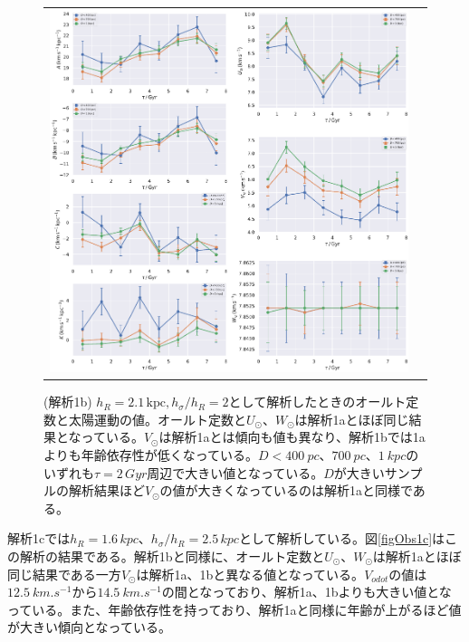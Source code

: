 \begin{figure}
   \centering
\begin{tabular}{cc}
\includegraphics[width=16cm]{fig/1b.pdf}
\end{tabular}
    \caption{(解析1b) $h_R=2.1\,\mathrm{kpc}, h_{\sigma}/h_R=2$として解析したときのオールト定数と太陽運動の値。オールト定数と$U_{\odot}、W_{\odot}$は解析1aとほぼ同じ結果となっている。$V_{\odot}$は解析1aとは傾向も値も異なり、解析1bでは1aよりも年齢依存性が低くなっている。$D<\SI{400}{pc}、\SI{700}{pc}、\SI{1}{kpc}$のいずれも$\tau=2\,\si{Gyr}$周辺で大きい値となっている。$D$が大きいサンプルの解析結果ほど$V_{\odot}$の値が大きくなっているのは解析1aと同様である。}
    \label{figObs1b}
\end{figure}

解析1cでは$h_R=1.6\,\si{kpc}、h_{\sigma}/h_R=2.5\,\si{kpc}$として解析している。図\ref{figObs1c}はこの解析の結果である。解析1bと同様に、オールト定数と$U_{\odot}、W_{\odot}$は解析1aとほぼ同じ結果である一方$V_{\odot}$は解析1a、1bと異なる値となっている。$V_{odot}$の値は$\SI{12.5}{km.s^{-1}}$から$\SI{14.5}{km.s^{-1}}$の間となっており、解析1a、1bよりも大きい値となっている。また、年齢依存性を持っており、解析1aと同様に年齢が上がるほど値が大きい傾向となっている。

